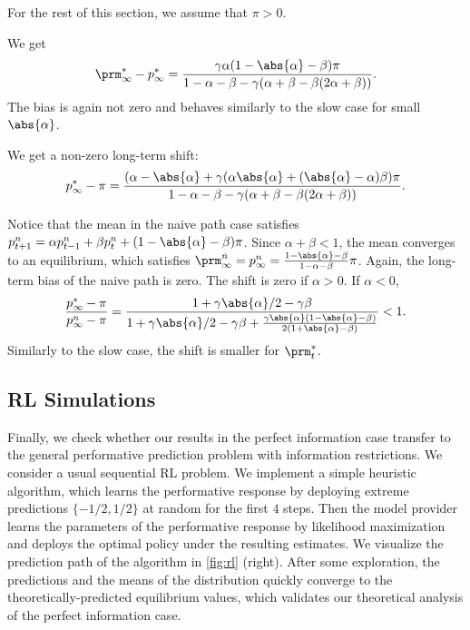 For the rest of this section, we assume that $\pi > 0$.

 We get
\[
    \prm^*_\infty - p^*_\infty = \frac{\gamma \alpha (1 - \abs{\alpha} - \beta)
    \pi}{1 - \alpha - \beta - \gamma (\alpha + \beta - \beta (2 \alpha +
    \beta))}.
\]
The bias is again not zero and behaves similarly to the slow case for small
$\abs{\alpha}$.

 We get a non-zero long-term shift:
\[
    p^*_\infty - \pi = \frac{(\alpha - \abs{\alpha} + \gamma (\alpha
    \abs{\alpha} + (\abs{\alpha} - \alpha) \beta) \pi}{1 - \alpha - \beta -
    \gamma (\alpha + \beta - \beta (2 \alpha + \beta))}.
\]

 Notice that the mean in the naive path case satisfies $p^n_{t+1} = \alpha
p^n_{t-1} + \beta p^n_t + (1 - \abs{\alpha} - \beta) \pi$. Since $\alpha +
\beta < 1$, the mean converges to an equilibrium, which satisfies $\prm^n_\infty = p^n_\infty = \frac{1 - \abs{\alpha} - \beta}{1 - \alpha -
    \beta} \pi$.
Again, the long-term bias of the naive path is zero. The shift is zero if
$\alpha > 0$. If $\alpha < 0$,
\[
    \frac{p^*_\infty - \pi}{p^n_\infty - \pi}
    = \frac{1 + \gamma \abs{\alpha} / 2 - \gamma \beta}{1 + \gamma \abs{\alpha}
    / 2 - \gamma \beta + \frac{\gamma \abs{\alpha} (1 - \abs{\alpha} -
    \beta)}{2 (1 + \abs{\alpha} - \beta)}} < 1.
\]
Similarly to the slow case, the shift is smaller for $\prm^*_t$.

\subsection{RL Simulations}
\label{sec:inf-rl}

Finally, we check whether our results in the perfect information case
transfer to the general performative prediction problem with information
restrictions. We consider a usual sequential RL problem. We implement a simple heuristic algorithm, which learns the
performative response by deploying extreme predictions $\{-1/2, 1/2\}$ at
random for the first $4$ steps. Then the model provider learns the parameters of
the performative response by likelihood maximization and deploys the optimal
policy under the resulting estimates. We visualize the prediction path of the algorithm
in \cref{fig:rl} (right). After some exploration, the predictions and the means of the distribution quickly converge to the
theoretically-predicted equilibrium values, which validates our theoretical
analysis of the perfect information case.
